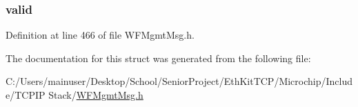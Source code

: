 \hypertarget{struct_passphrase_ready_a90686a66acdb55c0b14babfa9c621541}{}
\subsubsection[{valid}]{ valid}\label{struct_passphrase_ready_a90686a66acdb55c0b14babfa9c621541}


Definition at line 466 of file W\+F\+Mgmt\+Msg.\+h.



The documentation for this struct was generated from the following file\+:\begin{DoxyCompactItemize}
\item 
C\+:/\+Users/mainuser/\+Desktop/\+School/\+Senior\+Project/\+Eth\+Kit\+T\+C\+P/\+Microchip/\+Include/\+T\+C\+P\+I\+P Stack/\hyperlink{_w_f_mgmt_msg_8h}{W\+F\+Mgmt\+Msg.\+h}\end{DoxyCompactItemize}
